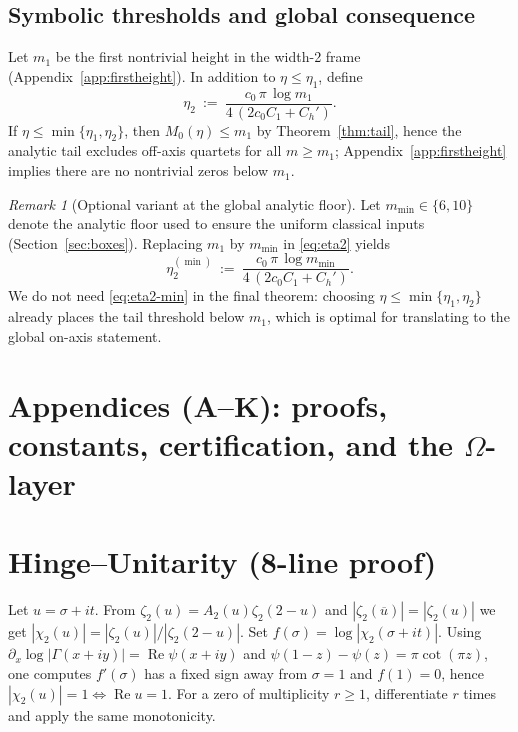 \documentclass[11pt]{article}
\numberwithin{equation}{section}
\theoremstyle{remark}
\newtheorem{remark}[theorem]{Remark}
\DeclareMathOperator{\Real}{Re}
\begin{document}
\subsection{Symbolic thresholds and global consequence}\label{subsec:thresholds}

Let $m_1$ be the first nontrivial height in the width-2 frame (Appendix~\ref{app:firstheight}). In addition to $\eta\le\eta_1$, define
\begin{equation}\label{eq:eta2}\tag{4.5}
\eta_2\ :=\ \frac{c_0\,\pi\,\log m_1}{4\,(2c_0C_1+C_h')}.
\end{equation}
If $\eta\le \min\{\eta_1,\eta_2\}$, then $M_0(\eta)\le m_1$ by Theorem~\ref{thm:tail}, hence the analytic tail excludes off-axis quartets for all $m\ge m_1$; Appendix~\ref{app:firstheight} implies there are no nontrivial zeros below $m_1$.

\begin{remark}[Optional variant at the global analytic floor]
Let $m_{\min}\in\{6,10\}$ denote the analytic floor used to ensure the uniform classical inputs (Section~\ref{sec:boxes}). Replacing $m_1$ by $m_{\min}$ in \eqref{eq:eta2} yields
\begin{equation}\label{eq:eta2-min}\tag{4.5.1}
\eta_2^{(\min)}\ :=\ \frac{c_0\,\pi\,\log m_{\min}}{4\,(2c_0C_1+C_h')}.
\end{equation}
We do not need \eqref{eq:eta2-min} in the final theorem: choosing $\eta\le\min\{\eta_1,\eta_2\}$ already places the tail threshold below $m_1$, which is optimal for translating to the global on-axis statement.
\end{remark}

\appendix

\section*{Appendices (A--K): proofs, constants, certification, and the $\Omega$-layer}

\section{Hinge--Unitarity (8-line proof)}\label{app:hinge}
Let $u=\sigma+it$. From $\zeta_2(u)=A_2(u)\zeta_2(2-u)$ and $|\zeta_2(\overline u)|=|\zeta_2(u)|$ we get $|\chi_2(u)|=|\zeta_2(u)|/|\zeta_2(2-u)|$. Set $f(\sigma)=\log|\chi_2(\sigma+it)|$. Using $\partial_x\log|\Gamma(x+iy)|=\Real\psi(x+iy)$ and $\psi(1-z)-\psi(z)=\pi\cot(\pi z)$, one computes $f'(\sigma)$ has a fixed sign away from $\sigma=1$ and $f(1)=0$, hence $|\chi_2(u)|=1\iff \Real u=1$. For a zero of multiplicity $r\ge1$, differentiate $r$ times and apply the same monotonicity.
\end{document}
